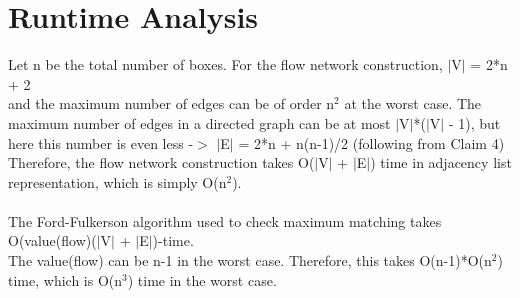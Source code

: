 \documentclass{article}
\begin{document}
\section{Runtime Analysis}
Let n be the total number of boxes.
For the flow network construction, $|$V$|$ = 2*n + 2\\
and the maximum number of edges can be of order n$^2$ at the worst case. The maximum number of edges in a directed graph can be at most $|$V$|$*($|$V$|$ - 1), but here this number is even less -$>$ $|$E$|$ = 2*n + n(n-1)/2 (following from Claim 4)\\
Therefore, the flow network construction takes O($|$V$|$ + $|$E$|$) time in adjacency list representation, which is simply O(n$^2$).\\
\\
The Ford-Fulkerson algorithm used to check maximum matching takes O(value(flow)($|$V$|$ + $|$E$|$)-time.\\
The value(flow) can be n-1 in the worst case. Therefore, this takes O(n-1)*O(n$^2$) time, which is O(n$^3$) time in the worst case.
\end{document}
